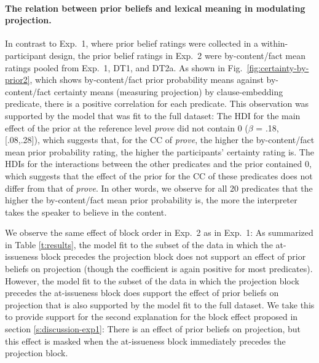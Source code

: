\documentclass[11pt,fleqn]{article}
\newcommand{\6}{\mbox{$[\hspace*{-.6mm}[$}}
\newcommand{\9}{\mbox{$]\hspace*{-.6mm}]$}}
\begin{document}
\paragraph{The relation between prior beliefs and lexical meaning in modulating projection.} In contrast to Exp.~1, where prior belief ratings were collected in a within-participant design, the prior belief ratings in Exp.~2 were by-content/fact mean ratings pooled from Exp.~1, DT1, and DT2a. As shown in Fig.~\ref{fig:certainty-by-prior2}, which shows by-content/fact  prior probability means against by-content/fact certainty means (measuring projection) by clause-embedding predicate, there is a positive correlation for each predicate. This observation was supported by the model that was fit to the full dataset: The HDI for the main effect of the prior at the reference level {\em prove} did not contain 0 ($\beta$ = .18, [.08,.28]), which suggests that, for the CC of {\em prove}, the higher the by-content/fact mean prior probability rating, the higher the participants' certainty rating is. The HDIs for the interactions between the other predicates and the prior contained 0, which suggests that the effect of the prior for the CC of these predicates does not differ from that of {\em prove}. In other words, we observe for all 20 predicates that the higher the by-content/fact mean prior probability is, the more the interpreter takes the speaker to believe in the content.

We observe the same effect of block order in Exp.~2 as in Exp.~1: As summarized in Table \ref{t:results}, the model fit to the subset of the data in which the at-issueness block precedes the projection block does not support an effect of prior beliefs on projection (though the coefficient is again positive for most predicates). However, the model fit to the subset of the data in which the projection block precedes the at-issueness block does support the effect of prior beliefs on projection that is also supported by the model fit to the full dataset. We take this to provide support for the second explanation for the block effect proposed in section \ref{s:discussion-exp1}: There is an effect of prior beliefs on projection, but this effect is masked when the at-issueness block immediately precedes the projection block.
\end{document}
